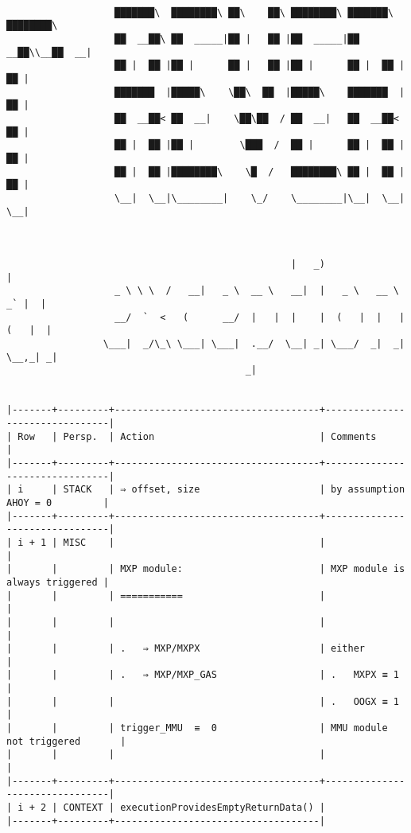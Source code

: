 \documentclass[varwidth=\maxdimen,margin=0.5cm,multi={verbatim}]{standalone}
\begin{document}
\begin{verbatim}

                   ███████\  ████████\ ██\    ██\ ████████\ ███████\ ████████\ 
                   ██  __██\ ██  _____|██ |   ██ |██  _____|██  __██\\__██  __|
                   ██ |  ██ |██ |      ██ |   ██ |██ |      ██ |  ██ |  ██ |   
                   ███████  |█████\    \██\  ██  |█████\    ███████  |  ██ |   
                   ██  __██< ██  __|    \██\██  / ██  __|   ██  __██<   ██ |   
                   ██ |  ██ |██ |        \███  /  ██ |      ██ |  ██ |  ██ |   
                   ██ |  ██ |████████\    \█  /   ████████\ ██ |  ██ |  ██ |   
                   \__|  \__|\________|    \_/    \________|\__|  \__|  \__|



                                                  |   _)                       | 
                   _ \ \ \  /   __|   _ \  __ \   __|  |   _ \   __ \    _` |  | 
                   __/  `  <   (      __/  |   |  |    |  (   |  |   |  (   |  | 
                 \___|  _/\_\ \___| \___|  .__/  \__| _| \___/  _|  _| \__,_| _| 
                                          _|


|-------+---------+------------------------------------+--------------------------------|
| Row   | Persp.  | Action                             | Comments                       |
|-------+---------+------------------------------------+--------------------------------|
| i     | STACK   | ⇒ offset, size                     | by assumption AHOY = 0         |
|-------+---------+------------------------------------+--------------------------------|
| i + 1 | MISC    |                                    |                                |
|       |         | MXP module:                        | MXP module is always triggered |
|       |         | ===========                        |                                |
|       |         |                                    |                                |
|       |         | .   ⇒ MXP/MXPX                     | either                         |
|       |         | .   ⇒ MXP/MXP_GAS                  | .   MXPX ≡ 1                   |
|       |         |                                    | .   OOGX ≡ 1                   |
|       |         | trigger_MMU  ≡  0                  | MMU module not triggered       |
|       |         |                                    |                                |
|-------+---------+------------------------------------+--------------------------------|
| i + 2 | CONTEXT | executionProvidesEmptyReturnData() |
|-------+---------+------------------------------------|

\end{verbatim}
\end{document}
